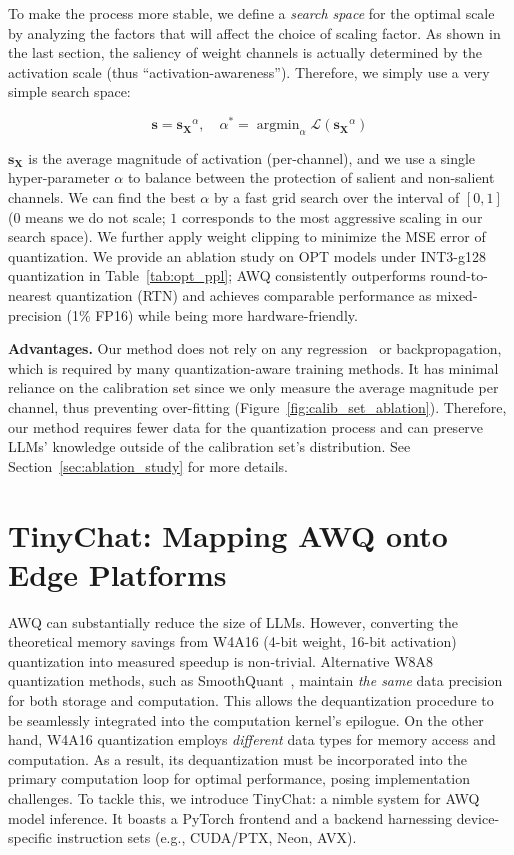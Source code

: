 To make the process more stable, we define a \emph{search space} for the optimal scale by analyzing the factors that will affect the choice of scaling factor. As shown in the last section, the saliency of weight channels is actually determined by the activation scale (thus ``activation-awareness''). Therefore, we simply use a very simple search space:

\begin{equation}
\label{eq:scale_search_formula}
    \mathbf{s}=\mathbf{s_X}^{\alpha}, \quad \alpha^*=\mathop{\arg\min}_{\alpha}\mathcal{L}(\mathbf{s_X}^{\alpha})
\end{equation}

$\mathbf{s_X}$ is the average magnitude of activation (per-channel), and we use a single hyper-parameter $\alpha$ to balance between the protection of salient and non-salient channels. We can find the best $\alpha$ by a fast grid search over the interval of $[0, 1]$ ($0$ means we do not scale; $1$  corresponds to the most aggressive scaling in our search space). We further apply weight clipping to minimize the MSE error of quantization. We provide an ablation study on OPT models under INT3-g128 quantization in Table~\ref{tab:opt_ppl}; AWQ consistently outperforms round-to-nearest quantization (RTN) and achieves comparable performance as mixed-precision (1\% FP16) while being more hardware-friendly.

\textbf{Advantages.} 
Our method does not rely on any regression~\cite{frantar2022gptq} or backpropagation, which is required by many quantization-aware training methods. It has minimal reliance on the calibration set since we only measure the average magnitude per channel, thus preventing over-fitting (Figure~\ref{fig:calib_set_ablation}). Therefore, our method requires fewer data for the quantization process and can preserve LLMs' knowledge outside of the calibration set's distribution. See Section~\ref{sec:ablation_study} for more details. 

\section{TinyChat: Mapping AWQ onto Edge Platforms}

AWQ can substantially reduce the size of LLMs. However, converting the theoretical memory savings from W4A16 (4-bit weight, 16-bit activation) quantization into measured speedup is non-trivial. Alternative W8A8 quantization methods, such as SmoothQuant~\cite{xiao2022smoothquant}, maintain \textit{the same} data precision for both storage and computation. This allows the dequantization procedure to be seamlessly integrated into the computation kernel's epilogue. On the other hand, W4A16 quantization employs \textit{different} data types for memory access and computation. As a result, its dequantization must be incorporated into the primary computation loop for optimal performance, posing implementation challenges. To tackle this, we introduce TinyChat: a nimble system for AWQ model inference. It boasts a PyTorch frontend and a backend harnessing device-specific instruction sets (e.g., CUDA/PTX, Neon, AVX).

